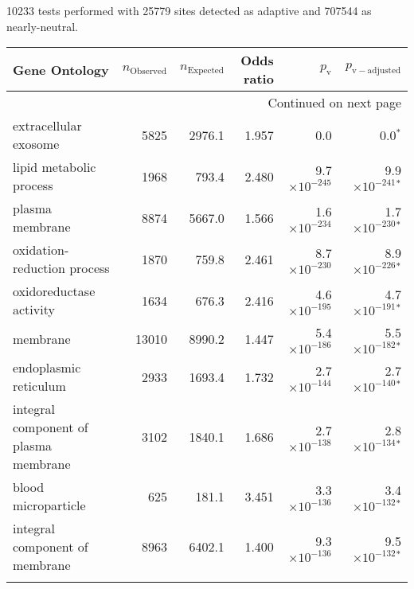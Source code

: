10233 tests performed with 25779 sites detected as adaptive and 707544 as nearly-neutral.
\scriptsize
\begin{longtable}{|l|r|r|r|r|r|}
\toprule
                                     Gene Ontology & $n_{\mathrm{Observed}}$ & $n_{\mathrm{Expected}}$ & Odds ratio &      $p_{\mathrm{v}}$ &       $p_{\mathrm{v-adjusted}}$ \\
\midrule
\endhead
\midrule
\multicolumn{6}{r}{{Continued on next page}} \\
\midrule
\endfoot

\bottomrule
\endlastfoot
                             extracellular exosome &                    5825 &                  2976.1 &      1.957 &                   0.0 &                    0.0$\bm{^*}$ \\
                           lipid metabolic process &                    1968 &                   793.4 &      2.480 & 9.7$\times 10^{-245}$ &  9.9$\times 10^{-241}$$\bm{^*}$ \\
                                   plasma membrane &                    8874 &                  5667.0 &      1.566 & 1.6$\times 10^{-234}$ &  1.7$\times 10^{-230}$$\bm{^*}$ \\
                       oxidation-reduction process &                    1870 &                   759.8 &      2.461 & 8.7$\times 10^{-230}$ &  8.9$\times 10^{-226}$$\bm{^*}$ \\
                           oxidoreductase activity &                    1634 &                   676.3 &      2.416 & 4.6$\times 10^{-195}$ &  4.7$\times 10^{-191}$$\bm{^*}$ \\
                                          membrane &                   13010 &                  8990.2 &      1.447 & 5.4$\times 10^{-186}$ &  5.5$\times 10^{-182}$$\bm{^*}$ \\
                             endoplasmic reticulum &                    2933 &                  1693.4 &      1.732 & 2.7$\times 10^{-144}$ &  2.7$\times 10^{-140}$$\bm{^*}$ \\
             integral component of plasma membrane &                    3102 &                  1840.1 &      1.686 & 2.7$\times 10^{-138}$ &  2.8$\times 10^{-134}$$\bm{^*}$ \\
                               blood microparticle &                     625 &                   181.1 &      3.451 & 3.3$\times 10^{-136}$ &  3.4$\times 10^{-132}$$\bm{^*}$ \\
                    integral component of membrane &                    8963 &                  6402.1 &      1.400 & 9.3$\times 10^{-136}$ &  9.5$\times 10^{-132}$$\bm{^*}$ \\
$$
\end{longtable}
